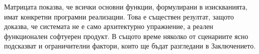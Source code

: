 Матрицата показва, че всички основни функции, формулирани в изискванията, имат конкретни програмни реализации. Това е съществен резултат, защото доказва, че системата не е само архитектурно упражнение, а реален функционален софтуерен продукт. В същото време няколко от сценариите ясно подсказват и ограничителни фактори, които ще бъдат разгледани в Заключението.
